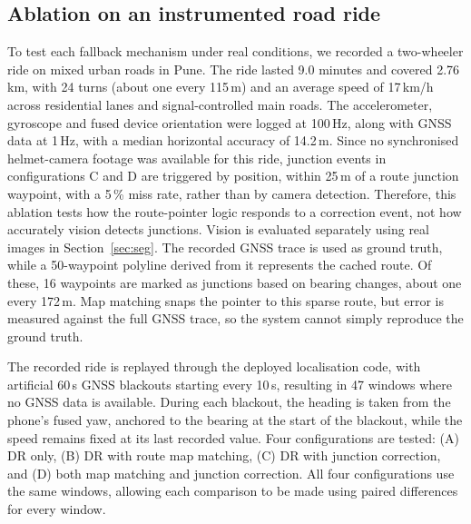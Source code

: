 \documentclass[conference]{IEEEtran}
\begin{document}
\subsection{Ablation on an instrumented road ride}
\label{sec:ablation}
To test each fallback mechanism under real conditions, we recorded a two-wheeler ride on mixed urban roads in Pune. The ride lasted 9.0 minutes and covered 2.76\,km, with 24 turns (about one every 115\,m) and an average speed of 17\,km/h across residential lanes and signal-controlled main roads. The accelerometer, gyroscope and fused device orientation were logged at 100\,Hz, along with GNSS data at 1\,Hz, with a median horizontal accuracy of 14.2\,m. Since no synchronised helmet-camera footage was available for this ride, junction events in configurations C and D are triggered by position, within 25\,m of a route junction waypoint, with a 5\,\% miss rate, rather than by camera detection. Therefore, this ablation tests how the route-pointer logic responds to a correction event, not how accurately vision detects junctions. Vision is evaluated separately using real images in Section~\ref{sec:seg}. The recorded GNSS trace is used as ground truth, while a 50-waypoint polyline derived from it represents the cached route. Of these, 16 waypoints are marked as junctions based on bearing changes, about one every 172\,m. Map matching snaps the pointer to this sparse route, but error is measured against the full GNSS trace, so the system cannot simply reproduce the ground truth.

The recorded ride is replayed through the deployed localisation code, with artificial 60\,s GNSS blackouts starting every 10\,s, resulting in 47 windows where no GNSS data is available. During each blackout, the heading is taken from the phone's fused yaw, anchored to the bearing at the start of the blackout, while the speed remains fixed at its last recorded value. Four configurations are tested: (A) DR only, (B) DR with route map matching, (C) DR with junction correction, and (D) both map matching and junction correction. All four configurations use the same windows, allowing each comparison to be made using paired differences for every window.
\end{document}
